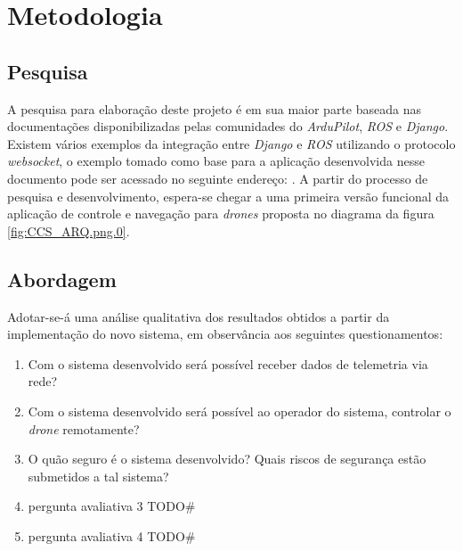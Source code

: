 \documentclass[12pt,a4paper,oneside]{book}
\begin{document}



\chapter{Metodologia}
\label{chapter:Metodologia e análise de trabalho semelhantes}
%
\thispagestyle{empty} 
%
\section{Pesquisa}
%
A pesquisa para elaboração deste projeto é em sua maior parte baseada nas documentações disponibilizadas pelas comunidades do \textit{ArduPilot}, \textit{ROS} e \textit{Django}. Existem vários exemplos da integração entre \textit{Django} e \textit{ROS} utilizando o protocolo \textit{websocket}, o exemplo tomado como base para a aplicação desenvolvida nesse documento pode ser acessado no seguinte endereço: \cite{url:django_ros}.
%
A partir do processo de pesquisa e desenvolvimento, espera-se chegar a uma primeira versão funcional da aplicação de controle e navegação para \textit{drones} proposta no diagrama da figura \ref{fig:CCS_ARQ.png.0}.

\section{Abordagem}
Adotar-se-á uma análise qualitativa dos resultados obtidos a partir da implementação do novo sistema, em observância aos seguintes questionamentos:
\begin{enumerate}
    \item Com o sistema desenvolvido será possível receber dados de telemetria via rede?
    \item Com o sistema desenvolvido será possível ao operador do sistema, controlar o \textit{drone} remotamente?
    \item O quão seguro é o sistema desenvolvido? Quais riscos de segurança estão submetidos a tal sistema?
    \item pergunta avaliativa 3 TODO#
    \item pergunta avaliativa 4 TODO#
\end{enumerate}
%
%
\end{document}
